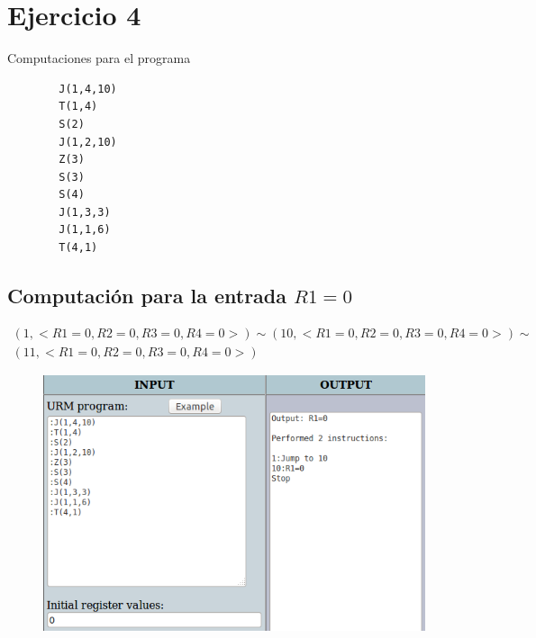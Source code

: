 \section{Ejercicio 4}
  		Computaciones para el programa
  		\begin{verbatim}
		J(1,4,10)
		T(1,4)
		S(2)
		J(1,2,10)
		Z(3)
		S(3)
		S(4)
		J(1,3,3)
		J(1,1,6)
		T(4,1)
  		\end{verbatim}
  		\subsection{Computación para la entrada $R1=0$}
  		\begin{equation*}\begin{gathered}
		(1, <R1=0, R2=0, R3=0, R4=0>) \sim (10, <R1=0, R2=0, R3=0, R4=0>) \sim\\
		(11, <R1=0, R2=0, R3=0, R4=0>)
		\end{gathered}\end{equation*}
		\begin{figure}[H]
  			\centering
  			\includegraphics[scale=0.5]{images/40.png}
  		\end{figure}

